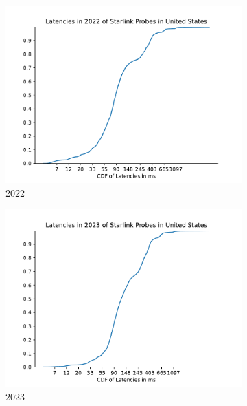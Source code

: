 \begin{figure}
	\centering
	\begin{subfigure}[b]{0.3\linewidth}
		\includegraphics[width=\linewidth]{chapters/4-results/latency/img/cdf_latencies_in_2022_of_starlink_probes_in_united_states.pdf}
		\caption{2022}
	\end{subfigure}
	\begin{subfigure}[b]{0.3\linewidth}
		\includegraphics[width=\linewidth]{chapters/4-results/latency/img/cdf_latencies_in_2023_of_starlink_probes_in_united_states.pdf}
		\caption{2023}
	\end{subfigure}
	\begin{subfigure}[b]{0.3\linewidth}

\end{subfigure}
\end{figure}
